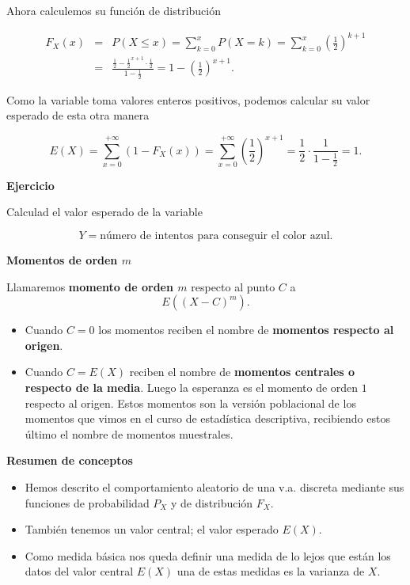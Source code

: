 \documentclass[]{book}
\providecommand{\tightlist}{%
  \setlength{\itemsep}{0pt}\setlength{\parskip}{0pt}}
\begin{document}
Ahora calculemos su función de distribución

\begin{eqnarray*}
F_X(x)&=& P(X\leq x)=\sum_{k=0}^x P(X=k)=\sum_{k=0}^x
\left(\frac12\right)^{k+1}\\
&=& \frac{\frac12-\frac12^{x+1}\cdot
\frac12}{1-\frac12}=1-\left(\frac12\right)^{x+1}.
\end{eqnarray*}

Como la variable toma valores enteros positivos, podemos calcular su valor esperado
de esta otra manera

\[E(X)=\sum_{x=0}^{+\infty} (1-F_X(x))=\sum_{x=0}^{+\infty}\left(\frac12\right)^{x+1}=\frac12\cdot
\frac1{1-\frac12}=1.\]

\textbf{Ejercicio}

Calculad el valor esperado de la variable

\[
Y=\mbox{número de intentos para conseguir el color azul.}
\]

\textbf{Momentos de orden \(m\)}

Llamaremos \textbf{momento de orden \(m\)} respecto al punto \(C\) a
\[E\left((X-C)^m\right).\]

\begin{itemize}
\tightlist
\item
  Cuando \(C=0\) los momentos reciben el nombre de \textbf{momentos respecto al origen}.
\item
  Cuando \(C=E(X)\) reciben el nombre de \textbf{momentos centrales o respecto de la media}. Luego la esperanza es el momento de orden \(1\) respecto al origen. Estos momentos son la versión poblacional de los momentos que vimos en el curso de estadística descriptiva, recibiendo estos último el nombre de momentos muestrales.
\end{itemize}

\textbf{Resumen de conceptos}

\begin{itemize}
\tightlist
\item
  Hemos descrito el comportamiento aleatorio de una v.a. discreta mediante sus funciones de probabilidad \(P_{X}\) y de distribución \(F_{X}\).
\item
  También tenemos un valor central; el valor esperado \(E(X)\).
\item
  Como medida básica nos queda definir una medida de lo lejos que están los datos del valor central \(E(X)\) una de estas medidas es la varianza de \(X\).
\end{itemize}
\end{document}

